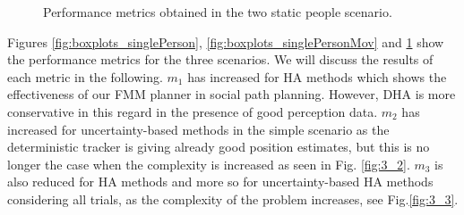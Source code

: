 \begin{figure}
%
%

\caption{Performance metrics obtained in the two static people scenario.
}
\label{fig:boxplots_2people}
\end{figure}


Figures \ref{fig:boxplots_singlePerson}, \ref{fig:boxplots_singlePersonMov} and \ref{fig:boxplots_2people} show the performance metrics for the three scenarios. We will discuss the results of each metric in the following. $m_{1}$ has increased for HA methods which shows the effectiveness of our FMM planner in social path planning. However, DHA is more conservative in this regard in the presence of good perception data. $m_{2}$ has increased for uncertainty-based methods in the simple scenario as the deterministic tracker is giving already good position estimates, but this is no longer the case when the complexity is increased as seen in Fig. \ref{fig:3_2}. $m_{3}$ is also reduced for HA methods and more so for uncertainty-based HA methods considering all trials, as the complexity of the problem increases, see Fig.\ref {fig:3_3}.


